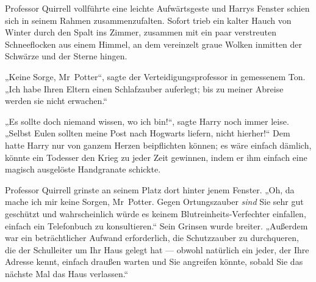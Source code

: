 Professor Quirrell vollführte eine leichte Aufwärtsgeste und Harrys Fenster schien sich in seinem Rahmen zusammenzufalten. Sofort trieb ein kalter Hauch von Winter durch den Spalt ins Zimmer, zusammen mit ein paar verstreuten Schneeflocken aus einem Himmel, an dem vereinzelt graue Wolken inmitten der Schwärze und der Sterne hingen.

„Keine Sorge, Mr~Potter“, sagte der Verteidigungsprofessor in gemessenem Ton.
„Ich habe Ihren Eltern einen Schlafzauber auferlegt; bis zu meiner Abreise werden sie nicht erwachen.“

„Es sollte doch niemand wissen, wo ich bin!“, sagte Harry noch immer leise.
„Selbst Eulen sollten meine Post nach Hogwarts liefern, nicht hierher!“ Dem hatte Harry nur von ganzem Herzen beipflichten können; es wäre einfach dämlich, könnte ein Todesser den Krieg zu jeder Zeit gewinnen, indem er ihm einfach eine magisch ausgelöste Handgranate schickte.

Professor Quirrell grinste an seinem Platz dort hinter jenem Fenster.
„Oh, da mache ich mir keine Sorgen, Mr~Potter. Gegen Ortungszauber \emph{sind} Sie sehr gut geschützt und wahrscheinlich würde es keinem Blutreinheits-Verfechter einfallen, einfach ein Telefonbuch zu konsultieren.“ Sein Grinsen wurde breiter.
„Außerdem war ein beträchtlicher Aufwand erforderlich, die Schutzzauber zu durchqueren, die der Schulleiter um Ihr Haus gelegt hat — obwohl natürlich ein jeder, der Ihre Adresse kennt, einfach draußen warten und Sie angreifen könnte, sobald Sie das nächste Mal das Haus verlassen.“

